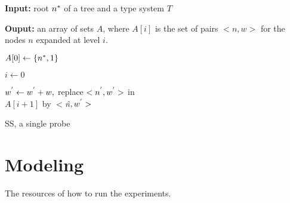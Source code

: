 \begin{algorithm}[H]
\textbf{Input:} root $n\sp{*}$ of a tree and a type system $T$ 

\textbf{Ouput:} an array of sets $A$, where $A[i]$ is the set of pairs $<n,w>$ for the nodes $n$ expanded at level $i$.

$A[0] \leftarrow \{n\sp{*},1\}$

$i \leftarrow 0$

 {
	 {
		 {
			 {
				$w\sp{'} \leftarrow w\sp{'} + w,$ replace $<n\sp{'}, w\sp{'}>$ in\\ $A[i+1]$ by $<$\textit{\^{n}}$,w\sp{'}>$
			
			}
		}
	}
}
\caption{SS, a single probe}
\label{alg:ss_algorithm}
\end{algorithm}

\section{Modeling}
The resources of how to run the experiments.

\clearpage